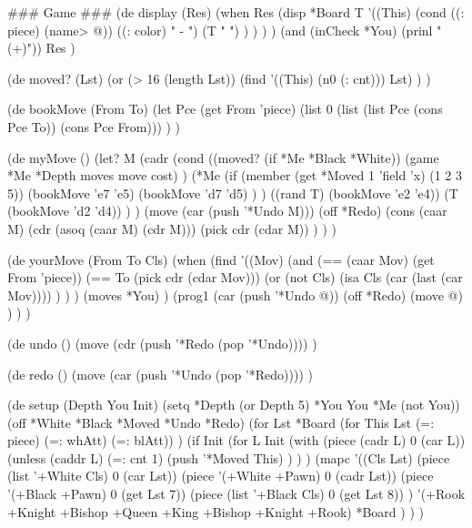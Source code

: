 \begin{wideverbatim}
 
### Game ###
(de display (Res)
   (when Res
      (disp *Board T
         '((This)
            (cond
               ((: piece) (name> @))
               ((: color) " - ")
               (T "   ") ) ) ) )
   (and (inCheck *You) (prinl "(+)"))
   Res )
 
(de moved? (Lst)
   (or
      (> 16 (length Lst))
      (find '((This) (n0 (: cnt))) Lst) ) )
 
(de bookMove (From To)
   (let Pce (get From 'piece)
      (list 0 (list (list Pce (cons Pce To)) (cons Pce From))) ) )
 
(de myMove ()
   (let? M
      (cadr
         (cond
            ((moved? (if *Me *Black *White))
               (game *Me *Depth moves move cost) )
            (*Me
               (if (member (get *Moved 1 'field 'x) (1 2 3 5))
                  (bookMove 'e7 'e5)
                  (bookMove 'd7 'd5) ) )
            ((rand T) (bookMove 'e2 'e4))
            (T (bookMove 'd2 'd4)) ) )
      (move (car (push '*Undo M)))
      (off *Redo)
      (cons
         (caar M)
         (cdr (asoq (caar M) (cdr M)))
         (pick cdr (cdar M)) ) ) )


\end{wideverbatim}

\begin{wideverbatim}

 
(de yourMove (From To Cls)
   (when
      (find
         '((Mov)
            (and
               (== (caar Mov) (get From 'piece))
               (== To (pick cdr (cdar Mov)))
               (or
                  (not Cls)
                  (isa Cls (car (last (car Mov)))) ) ) )
         (moves *You) )
      (prog1 (car (push '*Undo @))
         (off *Redo)
         (move @) ) ) )
 
(de undo ()
   (move (cdr (push '*Redo (pop '*Undo)))) )
 
(de redo ()
   (move (car (push '*Undo (pop '*Redo)))) )
 
(de setup (Depth You Init)
   (setq *Depth (or Depth 5)  *You You  *Me (not You))
   (off *White *Black *Moved *Undo *Redo)
   (for Lst *Board
      (for This Lst (=: piece) (=: whAtt) (=: blAtt)) )
   (if Init
      (for L Init
         (with (piece (cadr L) 0 (car L))
            (unless (caddr L)
               (=: cnt 1)
               (push '*Moved This) ) ) )
      (mapc
         '((Cls Lst)
            (piece (list '+White Cls) 0 (car Lst))
            (piece '(+White +Pawn) 0 (cadr Lst))
            (piece '(+Black +Pawn) 0 (get Lst 7))
            (piece (list '+Black Cls) 0 (get Lst 8)) )
         '(+Rook +Knight +Bishop +Queen +King +Bishop +Knight +Rook)
         *Board ) ) )


\end{wideverbatim}


